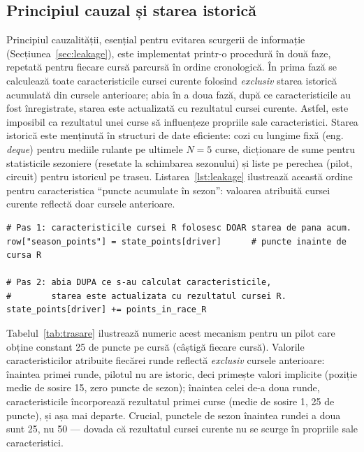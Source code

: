 \documentclass[12pt,a4paper]{report}
\begin{document}
\subsection{Principiul cauzal și starea istorică}

Principiul cauzalității, esențial pentru evitarea scurgerii de informație
(Secțiunea~\ref{sec:leakage}), este implementat printr-o procedură în două faze, repetată pentru
fiecare cursă parcursă în ordine cronologică. În prima fază se calculează toate caracteristicile
cursei curente folosind \emph{exclusiv} starea istorică acumulată din cursele anterioare; abia în a
doua fază, după ce caracteristicile au fost înregistrate, starea este actualizată cu rezultatul
cursei curente. Astfel, este imposibil ca rezultatul unei curse să influențeze propriile sale
caracteristici. Starea istorică este menținută în structuri de date eficiente: cozi cu lungime
fixă (eng. \emph{deque}) pentru mediile rulante pe ultimele $N = 5$ curse, dicționare de sume
pentru statisticile sezoniere (resetate la schimbarea sezonului) și liste pe perechea
(pilot, circuit) pentru istoricul pe traseu. Listarea~\ref{lst:leakage} ilustrează această ordine
pentru caracteristica ``puncte acumulate în sezon'': valoarea atribuită cursei curente reflectă
doar cursele anterioare.

\begin{lstlisting}[caption={Actualizarea stării istorice dupa calcularea caracteristicilor (principiul anti-leakage).}, label={lst:leakage}]
# Pas 1: caracteristicile cursei R folosesc DOAR starea de pana acum.
row["season_points"] = state_points[driver]      # puncte inainte de cursa R

# Pas 2: abia DUPA ce s-au calculat caracteristicile,
#        starea este actualizata cu rezultatul cursei R.
state_points[driver] += points_in_race_R
\end{lstlisting}

Tabelul~\ref{tab:trasare} ilustrează numeric acest mecanism pentru un pilot care obține constant 25
de puncte pe cursă (câștigă fiecare cursă). Valorile caracteristicilor atribuite fiecărei runde
reflectă \emph{exclusiv} cursele anterioare: înaintea primei runde, pilotul nu are istoric, deci
primește valori implicite (poziție medie de sosire 15, zero puncte de sezon); înaintea celei de-a
doua runde, caracteristicile încorporează rezultatul primei curse (medie de sosire 1, 25 de puncte),
și așa mai departe. Crucial, punctele de sezon înaintea rundei a doua sunt 25, nu 50 --- dovada că
rezultatul cursei curente nu se scurge în propriile sale caracteristici.
\end{document}
